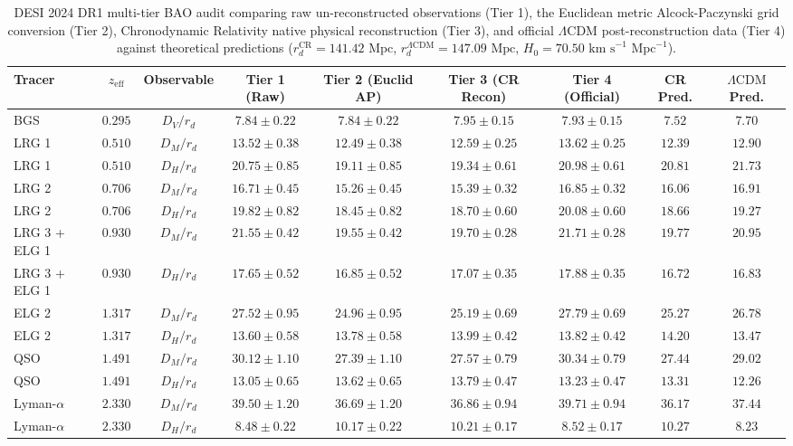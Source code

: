 \documentclass[aps,prd,reprint,superscriptaddress,nofootinbib,floatfix,amsmath,amssymb]{revtex4-2}
\begin{document}
\begin{table}[t]
\caption{\label{tab:desi_measurements}DESI 2024 DR1 multi-tier BAO audit comparing raw un-reconstructed observations (Tier 1), the Euclidean metric Alcock-Paczynski grid conversion (Tier 2), Chronodynamic Relativity native physical reconstruction (Tier 3), and official $\Lambda\text{CDM}$ post-reconstruction data (Tier 4) against theoretical predictions ($r_d^{\text{CR}} = 141.42\text{ Mpc}$, $r_d^{\Lambda\text{CDM}} = 147.09\text{ Mpc}$, $H_0 = 70.50\text{ km s}^{-1}\text{ Mpc}^{-1}$).}
\begin{ruledtabular}
{\footnotesize
\setlength{\tabcolsep}{2.5pt}
\begin{tabular}{lcccccccc}
Tracer & $z_{\text{eff}}$ & Observable & Tier 1 (Raw) & Tier 2 (Euclid AP) & Tier 3 (CR Recon) & Tier 4 (Official) & CR Pred. & $\Lambda\text{CDM}$ Pred. \\
\midrule
BGS & $0.295$ & $D_V / r_d$ & $7.84 \pm 0.22$ & $7.84 \pm 0.22$ & $7.95 \pm 0.15$ & $7.93 \pm 0.15$ & $7.52$ & $7.70$ \\
LRG 1 & $0.510$ & $D_M / r_d$ & $13.52 \pm 0.38$ & $12.49 \pm 0.38$ & $12.59 \pm 0.25$ & $13.62 \pm 0.25$ & $12.39$ & $12.90$ \\
LRG 1 & $0.510$ & $D_H / r_d$ & $20.75 \pm 0.85$ & $19.11 \pm 0.85$ & $19.34 \pm 0.61$ & $20.98 \pm 0.61$ & $20.81$ & $21.73$ \\
LRG 2 & $0.706$ & $D_M / r_d$ & $16.71 \pm 0.45$ & $15.26 \pm 0.45$ & $15.39 \pm 0.32$ & $16.85 \pm 0.32$ & $16.06$ & $16.91$ \\
LRG 2 & $0.706$ & $D_H / r_d$ & $19.82 \pm 0.82$ & $18.45 \pm 0.82$ & $18.70 \pm 0.60$ & $20.08 \pm 0.60$ & $18.66$ & $19.27$ \\
LRG 3 + ELG 1 & $0.930$ & $D_M / r_d$ & $21.55 \pm 0.42$ & $19.55 \pm 0.42$ & $19.70 \pm 0.28$ & $21.71 \pm 0.28$ & $19.77$ & $20.95$ \\
LRG 3 + ELG 1 & $0.930$ & $D_H / r_d$ & $17.65 \pm 0.52$ & $16.85 \pm 0.52$ & $17.07 \pm 0.35$ & $17.88 \pm 0.35$ & $16.72$ & $16.83$ \\
ELG 2 & $1.317$ & $D_M / r_d$ & $27.52 \pm 0.95$ & $24.96 \pm 0.95$ & $25.19 \pm 0.69$ & $27.79 \pm 0.69$ & $25.27$ & $26.78$ \\
ELG 2 & $1.317$ & $D_H / r_d$ & $13.60 \pm 0.58$ & $13.78 \pm 0.58$ & $13.99 \pm 0.42$ & $13.82 \pm 0.42$ & $14.20$ & $13.47$ \\
QSO & $1.491$ & $D_M / r_d$ & $30.12 \pm 1.10$ & $27.39 \pm 1.10$ & $27.57 \pm 0.79$ & $30.34 \pm 0.79$ & $27.44$ & $29.02$ \\
QSO & $1.491$ & $D_H / r_d$ & $13.05 \pm 0.65$ & $13.62 \pm 0.65$ & $13.79 \pm 0.47$ & $13.23 \pm 0.47$ & $13.31$ & $12.26$ \\
Lyman-$\alpha$ & $2.330$ & $D_M / r_d$ & $39.50 \pm 1.20$ & $36.69 \pm 1.20$ & $36.86 \pm 0.94$ & $39.71 \pm 0.94$ & $36.17$ & $37.44$ \\
Lyman-$\alpha$ & $2.330$ & $D_H / r_d$ & $8.48 \pm 0.22$ & $10.17 \pm 0.22$ & $10.21 \pm 0.17$ & $8.52 \pm 0.17$ & $10.27$ & $8.23$ \\
\end{tabular}
}
\end{ruledtabular}
\end{table}
\end{document}
